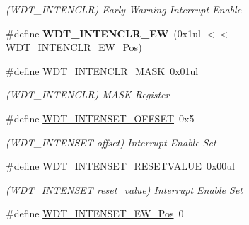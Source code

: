\begin{DoxyCompactItemize}
\begin{DoxyCompactList}\small\item\em (W\+D\+T\+\_\+\+I\+N\+T\+E\+N\+C\+L\+R) Early Warning Interrupt Enable \end{DoxyCompactList}\item 
\hypertarget{group___s_a_m_l21___w_d_t_ga3eafb419ed0c9165cf7123817e5fcf63}{}\#define {\bfseries W\+D\+T\+\_\+\+I\+N\+T\+E\+N\+C\+L\+R\+\_\+\+E\+W}~(0x1ul $<$$<$ W\+D\+T\+\_\+\+I\+N\+T\+E\+N\+C\+L\+R\+\_\+\+E\+W\+\_\+\+Pos)\label{group___s_a_m_l21___w_d_t_ga3eafb419ed0c9165cf7123817e5fcf63}

\item 
\hypertarget{group___s_a_m_l21___w_d_t_ga261d65af584086a561448aeedeabbd76}{}\#define \hyperlink{group___s_a_m_l21___w_d_t_ga261d65af584086a561448aeedeabbd76}{W\+D\+T\+\_\+\+I\+N\+T\+E\+N\+C\+L\+R\+\_\+\+M\+A\+S\+K}~0x01ul\label{group___s_a_m_l21___w_d_t_ga261d65af584086a561448aeedeabbd76}

\begin{DoxyCompactList}\small\item\em (W\+D\+T\+\_\+\+I\+N\+T\+E\+N\+C\+L\+R) M\+A\+S\+K Register \end{DoxyCompactList}\item 
\hypertarget{group___s_a_m_l21___w_d_t_ga6497c59af95b3fd1aad2b074a75e4173}{}\#define \hyperlink{group___s_a_m_l21___w_d_t_ga6497c59af95b3fd1aad2b074a75e4173}{W\+D\+T\+\_\+\+I\+N\+T\+E\+N\+S\+E\+T\+\_\+\+O\+F\+F\+S\+E\+T}~0x5\label{group___s_a_m_l21___w_d_t_ga6497c59af95b3fd1aad2b074a75e4173}

\begin{DoxyCompactList}\small\item\em (W\+D\+T\+\_\+\+I\+N\+T\+E\+N\+S\+E\+T offset) Interrupt Enable Set \end{DoxyCompactList}\item 
\hypertarget{group___s_a_m_l21___w_d_t_ga9ac75e52d30478302b59583789dca453}{}\#define \hyperlink{group___s_a_m_l21___w_d_t_ga9ac75e52d30478302b59583789dca453}{W\+D\+T\+\_\+\+I\+N\+T\+E\+N\+S\+E\+T\+\_\+\+R\+E\+S\+E\+T\+V\+A\+L\+U\+E}~0x00ul\label{group___s_a_m_l21___w_d_t_ga9ac75e52d30478302b59583789dca453}

\begin{DoxyCompactList}\small\item\em (W\+D\+T\+\_\+\+I\+N\+T\+E\+N\+S\+E\+T reset\+\_\+value) Interrupt Enable Set \end{DoxyCompactList}\item 
\hypertarget{group___s_a_m_l21___w_d_t_gab3754e1861849b0fbb6d056b8b6ac398}{}\#define \hyperlink{group___s_a_m_l21___w_d_t_gab3754e1861849b0fbb6d056b8b6ac398}{W\+D\+T\+\_\+\+I\+N\+T\+E\+N\+S\+E\+T\+\_\+\+E\+W\+\_\+\+Pos}~0\label{group___s_a_m_l21___w_d_t_gab3754e1861849b0fbb6d056b8b6ac398}


\end{DoxyCompactItemize}
